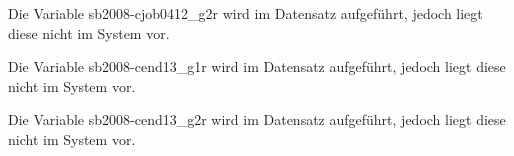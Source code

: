 \documentclass[a4paper]{article}
\begin{document}
				

				

				

				

				

				

				

		Die Variable sb2008-cjob0412\_g2r wird im Datensatz aufgeführt, jedoch liegt diese nicht im System vor.

				

				

				

				

				

				

				

		Die Variable sb2008-cend13\_g1r wird im Datensatz aufgeführt, jedoch liegt diese nicht im System vor.

		Die Variable sb2008-cend13\_g2r wird im Datensatz aufgeführt, jedoch liegt diese nicht im System vor.

				

				

				

				

				

				

				

				

				

				

				

				

				

				
\end{document}
